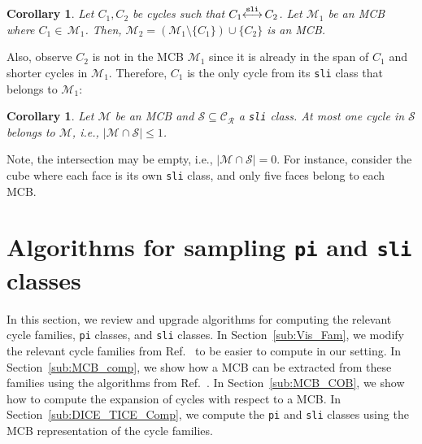 \documentclass[fleqn,11pt]{article}
\newtheorem{corollary}[theorem]{Corollary}
\newcommand\calM{\mathcal{M}}
\newcommand\calT{\mathcal{T}}     %
\newcommand\calS{\mathcal{S}}     %
\newcommand\RelCyc{\mathcal{C_R}} %
\newcommand\slInt{ \stackrel{\tt sli}{\longleftrightarrow} }
\begin{document}
\begin{corollary}
	Let $C_1,C_2$ be cycles such that $C_1{\slInt}\, C_2$. %
	Let $\calM_1$ be an MCB where $C_1{\in}\,\calM_1$. Then, $\calM_2=(\calM_1\setminus\{C_1\})\cup\{C_2\}$ is an MCB.
	\label{Cor:TrInt_Exchanges}
\end{corollary}

Also, observe $C_2$ is not in the MCB $\calM_1$ since it is already in the span of $C_1$ and shorter cycles in $\calM_1$. 
Therefore, $C_1$ is the only cycle from its {\tt sli} class that belongs to $\calM_1$:

\begin{corollary}
	Let $\calM$ be an MCB and $\calS\subseteq\RelCyc$ a {\tt sli} class. At most one cycle in $\calS$ belongs to $\calM$, i.e., $|\calM\cap\calS|\le 1$. %
	\label{Cor:tr_intchg_rank}
\end{corollary}

Note, the intersection may be empty, i.e., $|\calM\cap\calS|=0$. For instance, consider the cube where each face is its own {\tt sli} class, and only five faces belong to each MCB.








\section{Algorithms for sampling {\tt pi} and {\tt sli} classes}
\label{sec:algorithm}

In this section, we review and upgrade algorithms for computing the relevant cycle families, {\tt pi} classes, and {\tt sli} classes. In Section~\ref{sub:Vis_Fam}, we modify the relevant cycle families from Ref.~\cite{vismaraUnion1997} to be easier to compute in our setting. In Section~\ref{sub:MCB_comp}, we {show how a MCB can be extracted from these families using the algorithms from Ref.~\cite{kavithaFaster2004}.} In Section~\ref{sub:MCB_COB}, we show how to compute the expansion of cycles with respect to a MCB. In Section~\ref{sub:DICE_TICE_Comp}, we compute the {\tt pi} and {\tt sli} classes using the MCB representation of the cycle families.
%
%
\end{document}
